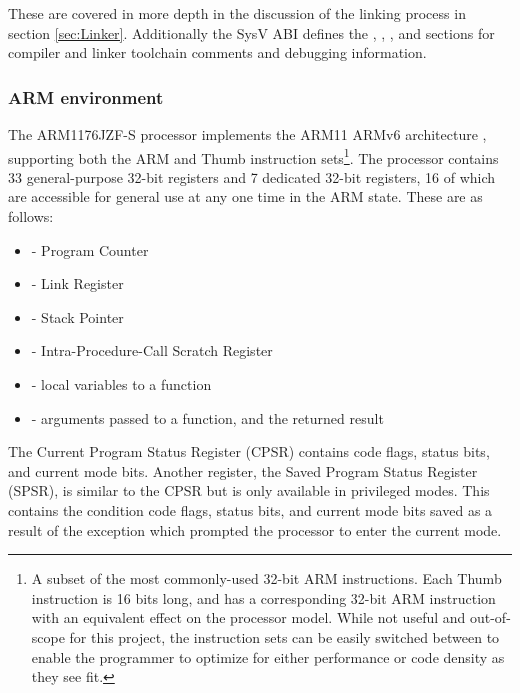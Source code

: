         These are covered in more depth in the discussion of the linking process
        in section \ref{sec:Linker}. Additionally the SysV ABI defines the
        , , , and 
        sections for compiler and linker toolchain comments and debugging
        information.

    \subsubsection{ARM environment}
       The ARM1176JZF-S processor implements the ARM11 ARMv6 architecture
       \cite{TRM}, supporting both the ARM and Thumb instruction sets\footnote{A
       subset of the most commonly-used 32-bit ARM instructions.  Each Thumb
       instruction is 16 bits long, and has a corresponding 32-bit ARM
       instruction with an equivalent effect on the processor model. While not
       useful and out-of-scope for this project, the instruction sets can be
       easily switched between to enable the programmer to optimize for either
       performance or code density as they see fit.}. The processor contains 33
       general-purpose 32-bit registers and 7 dedicated 32-bit registers, 16 of
       which are accessible for general use at any one time in the ARM state.
       These are as follows:
       \begin{itemize}
           \itemsep0em
           \item {} - Program Counter
           \item {} - Link Register
           \item {} - Stack Pointer
           \item {} - Intra-Procedure-Call Scratch Register
           \item {} - local variables to a function
           \item {} - arguments passed to a function, and the returned
               result
       \end{itemize}

       The Current Program Status Register (CPSR) contains code flags, status
       bits, and current mode bits.  Another register, the Saved Program Status
       Register (SPSR), is similar to the CPSR but is only available in
       privileged modes. This contains the condition code flags, status bits,
       and current mode bits saved as a result of the exception which prompted
       the processor to enter the current mode.

